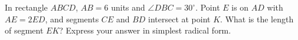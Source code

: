 In rectangle $ABCD$, $AB=6$ units and $\angle DBC=30^\circ$. Point $E$ is on $AD$ with $AE=2ED$, and segments $CE$ and $BD$ intersect at point $K$. What is the length of segment $EK$? Express your answer in simplest radical form.
